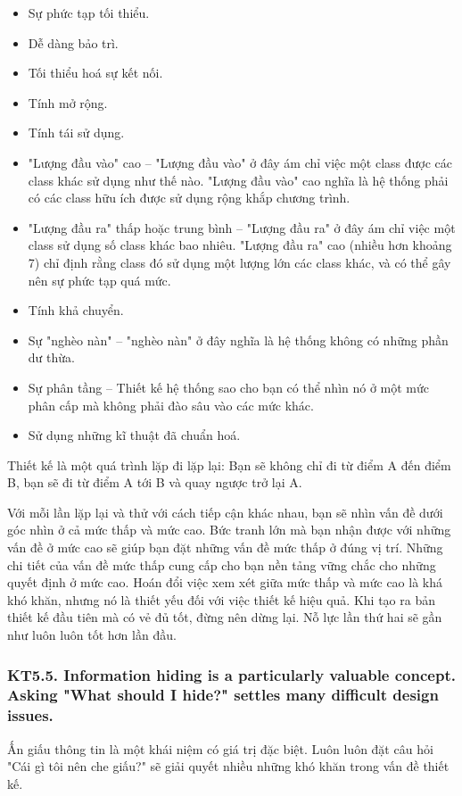 \documentclass[12pt]{report}
\begin{document}
\begin{itemize}
	\item Sự phức tạp tối thiểu. 
	\item Dễ dàng bảo trì. 
	\item Tối thiểu hoá sự kết nối. 
	\item Tính mở rộng. 
	\item Tính tái sử dụng. 
	\item "Lượng đầu vào" cao -- "Lượng đầu vào" ở đây ám chỉ việc một class được các class khác sử dụng như thế nào. "Lượng đầu vào" cao nghĩa là hệ thống phải có các class hữu ích được sử dụng rộng khắp chương trình. 
	\item "Lượng đầu ra" thấp hoặc trung bình -- "Lượng đầu ra" ở đây ám chỉ việc một class sử dụng số class khác bao nhiêu. 
	"Lượng đầu ra" cao (nhiều hơn khoảng 7) chỉ định rằng class đó sử dụng một lượng lớn các class khác, và có thể gây nên sự phức tạp quá mức. 
	\item Tính khả chuyển. 
	\item Sự "nghèo nàn" -- "nghèo nàn" ở đây nghĩa là hệ thống không có những phần dư thừa. 
	\item Sự phân tầng -- Thiết kế hệ thống sao cho bạn có thể nhìn nó ở một mức phân cấp mà không phải đào sâu vào các mức khác. 
	\item Sử dụng những kĩ thuật đã chuẩn hoá.
	 
\end{itemize}
\vspace*{3mm}


Thiết kế là một quá trình lặp đi lặp lại: Bạn sẽ không chỉ đi từ điểm A đến điểm B, bạn sẽ đi từ điểm A tới B và quay ngược trở lại A. 

Với mỗi lần lặp lại và thử với cách tiếp cận khác nhau, bạn sẽ nhìn vấn đề dưới góc nhìn ở cả mức thấp và mức cao. Bức tranh lớn mà bạn nhận được với những vấn đề ở mức cao sẽ giúp bạn đặt những vấn đề mức thấp ở đúng vị trí. Những chi tiết của vấn đề mức thấp cung cấp cho bạn nền tảng vững chắc cho những quyết định ở mức cao. Hoán đổi việc xem xét giữa mức thấp và mức cao là khá khó khăn, nhưng nó là thiết yếu đối với việc thiết kế hiệu quả. Khi tạo ra bản thiết kế đầu tiên mà có vẻ đủ tốt, đừng nên dừng lại. Nỗ lực lần thứ hai sẽ gần như luôn luôn tốt hơn lần đầu. 


\subsubsection{KT5.5. Information hiding is a particularly valuable concept. Asking "What should I hide?" settles many difficult design issues.}
Ấn giấu thông tin là một khái niệm có giá trị đặc biệt. Luôn luôn đặt câu hỏi "Cái gì tôi nên che giấu?" sẽ giải quyết nhiều những  khó khăn trong vấn đề thiết kế.  
\vspace*{3mm}
\end{document}
